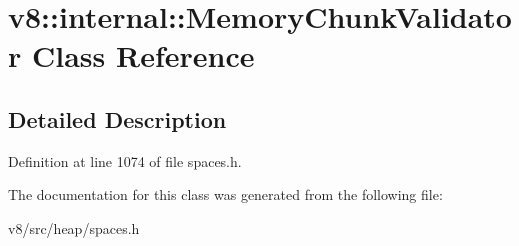 \hypertarget{classv8_1_1internal_1_1MemoryChunkValidator}{}\section{v8\+:\+:internal\+:\+:Memory\+Chunk\+Validator Class Reference}
\label{classv8_1_1internal_1_1MemoryChunkValidator}


\subsection{Detailed Description}


Definition at line 1074 of file spaces.\+h.



The documentation for this class was generated from the following file\+:\begin{DoxyCompactItemize}
\item 
v8/src/heap/spaces.\+h\end{DoxyCompactItemize}
